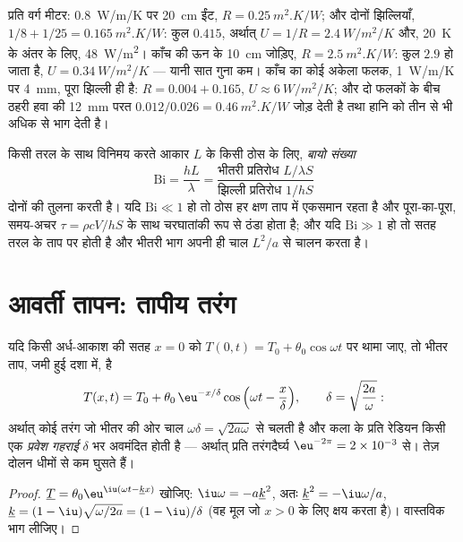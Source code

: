 \begin{example}[कोई दीवार और कोई खिड़की]\label{ex:b2:heat-conduction:wall}
प्रति वर्ग मीटर: \qty{0.8}{W/m/K} पर \qty{20}{cm} ईंट, $R =
\qty{0.25}{m^2.K/W}$; और दोनों झिल्लियाँ, $1/8 + 1/25 = \qty{0.165}{m^2.K/W}$:
कुल $0.415$, अर्थात् $U = 1/R = \qty{2.4}{W/m^2/K}$ और, \qty{20}{K}
के अंतर के लिए, \qty{48}{W/m^2}। काँच की ऊन के \qty{10}{cm} जोड़िए, $R =
\qty{2.5}{m^2.K/W}$: कुल $2.9$ हो जाता है, $U = \qty{0.34}{W/m^2/K}$ ---
यानी सात गुना कम। काँच का कोई अकेला फलक, \qty{1}{W/m/K} पर \qty{4}{mm},
पूरा झिल्ली ही है: $R = 0.004 + 0.165$, $U \approx \qty{6}{W/m^2/K}$; और दो
फलकों के बीच ठहरी हवा की \qty{12}{mm} परत $0.012/0.026 =
\qty{0.46}{m^2.K/W}$ जोड़ देती है तथा हानि को तीन से भी अधिक से भाग देती है।
\end{example}

\begin{definition}[बायो संख्या]\label{def:b2:heat-conduction:biot}
किसी तरल के साथ विनिमय करते आकार $L$ के किसी ठोस के लिए, \emph{बायो
संख्या}
\[
\mathrm{Bi} = \frac{hL}{\lambda} = \frac{\text{भीतरी प्रतिरोध } L/\lambda S}{\text{झिल्ली प्रतिरोध } 1/hS}
\]
दोनों की तुलना करती है। यदि $\mathrm{Bi} \ll 1$ हो तो ठोस हर क्षण ताप में
एकसमान रहता है और पूरा-का-पूरा, समय-अचर $\tau = \rho c V/hS$ के साथ चरघातांकी
रूप से ठंडा होता है; और यदि $\mathrm{Bi} \gg 1$ हो तो
सतह तरल के ताप पर होती है और भीतरी भाग अपनी ही
चाल $L^2/a$ से चालन करता है।
\end{definition}

\section{आवर्ती तापन: तापीय तरंग}

\begin{proposition}[किसी अर्ध-आकाश में तापीय तरंग]\label{prop:b2:heat-conduction:wave}
यदि किसी अर्ध-आकाश की सतह $x = 0$ को $T(0,t) = T_0 +
\theta_0\cos\omega t$ पर थामा जाए, तो भीतर ताप, जमी हुई
दशा में, है
\[
T(x,t) = T_0 + \theta_0\,\eu^{-x/\delta}\cos\Big(\omega t - \frac{x}{\delta}\Big),
\qquad \delta = \sqrt{\frac{2a}{\omega}} :
\]
अर्थात् कोई तरंग जो भीतर की ओर चाल $\omega\delta =
\sqrt{2a\omega}$ से चलती है और कला के प्रति रेडियन किसी एक \emph{प्रवेश गहराई} $\delta$
भर अवमंदित होती है --- अर्थात् प्रति तरंगदैर्घ्य $\eu^{-2\pi} = 2 \times 10^{-3}$ से।
तेज़ दोलन धीमों से कम घुसते हैं।
\end{proposition}

\begin{proof}
$\underline T = \theta_0\eu^{\iu(\omega t - \underline k x)}$ खोजिए:
$\iu\omega = -a\underline k^2$, अतः $\underline k^2 = -\iu\omega/a$,
$\underline k = (1 - \iu)\sqrt{\omega/2a} = (1 - \iu)/\delta$ (वह मूल
जो $x > 0$ के लिए क्षय करता है)। वास्तविक भाग लीजिए।
\end{proof}

